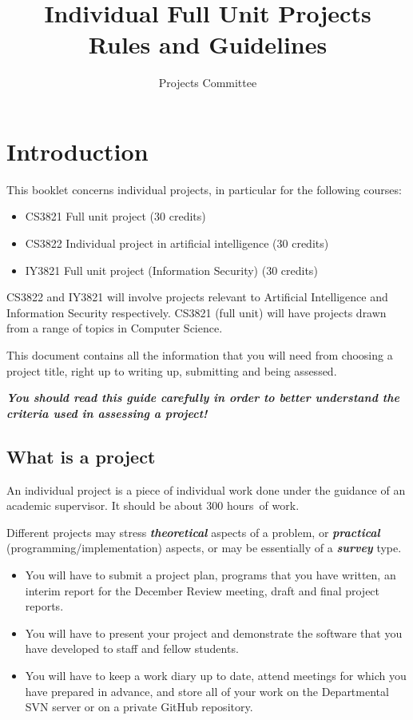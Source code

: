 \documentclass[11pt]{article}
\title{\sf\bfseries Individual Full Unit Projects \academicYear\\Rules and Guidelines}
\author{\sf Projects Committee\\ \projcom}
\newcommand{\workload}{300 hours}
\begin{document}
\maketitle
\thispagestyle{empty}


\section{Introduction}
This booklet concerns individual projects, in particular for the following courses:
\begin{itemize}
 \item CS3821 Full unit project (30 credits)
 \item CS3822 Individual project in artificial intelligence (30 credits)
 \item IY3821 Full unit project (Information Security) (30 credits)

\end{itemize}

CS3822 and IY3821 will involve projects relevant to Artificial Intelligence and Information Security respectively. CS3821 (full unit) will have projects drawn
from a range of topics in Computer Science.

This document contains all the information that you will need from choosing a project title, right up to writing up, submitting and being assessed.

\textbf{\textit{\textcolor[rgb]{1,0,0.501961}{You should read this guide carefully in order to better understand the criteria used in assessing a project!}}}

\subsection{What is a project}

An individual project is a piece of individual work done under the guidance of an academic supervisor.  It should be about \workload\ of work.

Different projects may stress \textbf{\textit{theoretical}} aspects of a problem, or \textbf{\textit{practical}} (programming/implementation) aspects, or may be essentially of a \textbf{\textit{survey}} type.

\begin{itemize}
\item You will have to submit a project plan, programs that you have written, an interim report for the December Review meeting, draft and final project reports.

\item You will have to present your project and demonstrate the software that you have developed to staff and fellow students.

\item You will have to keep a work diary up to date, attend meetings for which you have prepared in advance, and store all of your work on the Departmental SVN server or on a private GitHub repository.
\end{itemize}
\end{document}
